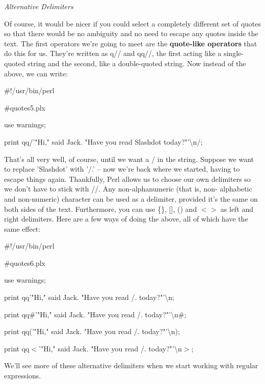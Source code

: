 \documentclass[a4paper,11pt]{book}
\begin{document}
\noindent 

\noindent 

\noindent \textit{Alternative Delimiters}

\noindent Of course, it would be nicer if you could select a completely different set of quotes so that there would be no ambiguity and no need to escape any quotes inside the text. The first operators we're going to meet are the \textbf{quote-like operators }that do this for us. They're written as q// and qq//, the first acting like a single-quoted string and the second, like a double-quoted string. Now instead of the above, we can write:

\noindent 

\noindent \#!/usr/bin/perl

\noindent \#quotes5.plx

\noindent use warnings;

\noindent print qq/'"Hi," said Jack. "Have you read Slashdot today?"'\textbackslash n/;

\noindent 

\noindent That's all very well, of course, until we want a / in the string. Suppose we want to replace 'Slashdot' with '/.' -- now we're back where we started, having to escape things again. Thankfully, Perl allows us to choose our own delimiters so we don't have to stick with //. Any non-alphanumeric (that is, non- alphabetic and non-numeric) character can be used as a delimiter, provided it's the same on both sides  of the text. Furthermore, you can use \{\}, [], () and $<$$>$ as left and right delimiters. Here are a few ways of doing the above, all of which have the same effect:

\noindent 

\noindent \#!/usr/bin/perl

\noindent \#quotes6.plx

\noindent use warnings;

\noindent print qq\textbar '"Hi," said Jack. "Have you read /. today?"'\textbackslash n\textbar ;

\noindent print qq\#'"Hi," said Jack. "Have you read /. today?"'\textbackslash n\#;

\noindent print qq('"Hi," said Jack. "Have you read /. today?"'\textbackslash n);

\noindent print qq$<$'"Hi," said Jack. "Have you read /. today?"'\textbackslash n$>$;

\noindent 

\noindent We'll see more of these alternative delimiters when we start working with regular expressions.
\end{document}
